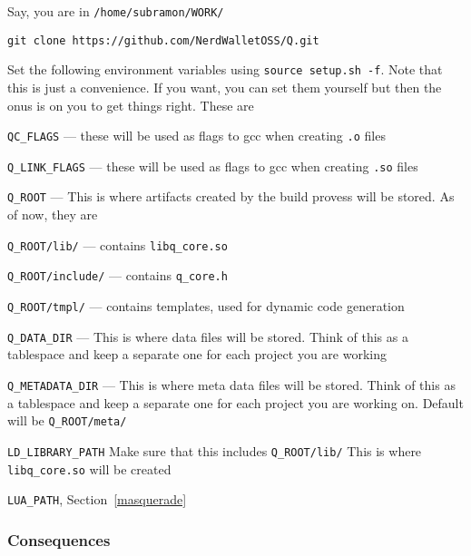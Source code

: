 \be
\item Say, you are in \verb+/home/subramon/WORK/+ 
\item \verb+git clone https://github.com/NerdWalletOSS/Q.git+
\item Set the following environment variables
using \verb+source setup.sh -f+. Note that this is just a convenience. If you
want, you can set them yourself but then the onus is on you to get things right.
These are
\be
\item \verb+QC_FLAGS+ --- these will be used as flags to gcc when creating
\verb+.o+ files
\item\verb+Q_LINK_FLAGS+ --- these will be used as flags to gcc when creating
\verb+.so+ files
\item \verb+Q_ROOT+ ---  This is where artifacts created by the build provess
will be stored. As of now, they are
\be
\item \verb+Q_ROOT/lib/+ --- contains \verb+libq_core.so+
\item \verb+Q_ROOT/include/+ --- contains \verb+q_core.h+
\item \verb+Q_ROOT/tmpl/+ --- contains templates, used for dynamic code
generation
\ee
\item \verb+Q_DATA_DIR+ --- This is where data files will be stored. Think of
this as a tablespace and keep a separate one for each project you are working
\item \verb+Q_METADATA_DIR+ --- This is where meta data files will be stored. Think of
this as a tablespace and keep a separate one for each project you are working
on. Default will be \verb+Q_ROOT/meta/+
\item 
\verb+LD_LIBRARY_PATH+ Make sure that this includes \verb+Q_ROOT/lib/+ This is
where \verb+libq_core.so+ will be created
\item \verb+LUA_PATH+, Section~\ref{masquerade}
\ee
\ee

\subsubsection{Consequences}

